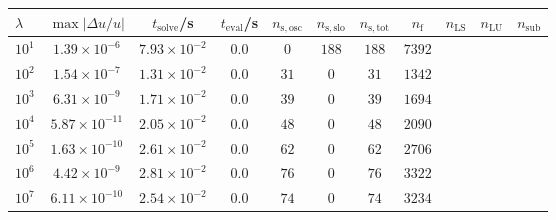 \begin{tabular}{l c c c c c c c c c c}
\hline \hline 
$\lambda$  &  $\max|\Delta u/u|$  &  $t_{\mathrm{solve}}$/\si{\s}  &
$t_{\mathrm{eval}}$/\si{\s}  &  $n_{\mathrm{s,osc}}$  &  $n_{\mathrm{s,slo}}$
&  $n_{\mathrm{s,tot}}$  &  $n_{\mathrm{f}}$  &  $n_{\mathrm{LS}}$  &
$n_{\mathrm{LU}}$  &  $n_{\mathrm{sub}}$ \\ \hline

$10^1$  &  $1.39 \times 10^{-6}$  &  $7.93 \times 10^{-2}$  &  $0.0$  &  $0$  &  $188$  &  $188$  &  $7392$ & & & \\ 
$10^2$  &  $1.54 \times 10^{-7}$  &  $1.31 \times 10^{-2}$  &  $0.0$  &  $31$  &  $0$  &  $31$  &  $1342$  & & & \\ 
$10^3$  &  $6.31 \times 10^{-9}$  &  $1.71 \times 10^{-2}$  &  $0.0$  &  $39$  &  $0$  &  $39$  &  $1694$  & & & \\ 
$10^4$  &  $5.87 \times 10^{-11}$  &  $2.05 \times 10^{-2}$  &  $0.0$  &  $48$  &  $0$  &  $48$  &  $2090$  & & & \\ 
$10^5$  &  $1.63 \times 10^{-10}$  &  $2.61 \times 10^{-2}$  &  $0.0$  &  $62$  &  $0$  &  $62$  &  $2706$  & & & \\ 
$10^6$  &  $4.42 \times 10^{-9}$  &  $2.81 \times 10^{-2}$  &  $0.0$  &  $76$  &  $0$  &  $76$  &  $3322$  & & & \\ 
$10^7$  &  $6.11 \times 10^{-10}$  &  $2.54 \times 10^{-2}$  &  $0.0$  &  $74$  &  $0$  &  $74$  &  $3234$  & & & \\ 
\hline \hline
\end{tabular}
